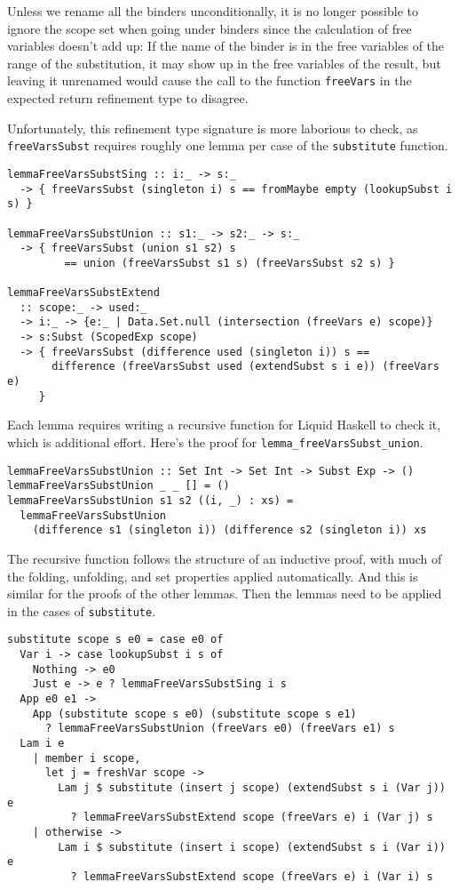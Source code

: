 \documentclass[acmtog, anonymous]{acmart}
\newcommand{\tc}[1]{{\small\texttt{#1}}}
\begin{document}
Unless we rename all the binders unconditionally, it is no longer
possible to ignore the scope set when going under binders since the calculation
of free variables doesn't add up:
If the name of the binder is in the free variables of the range of the substitution,
it may show up in the free variables of the result, but leaving it unrenamed would
cause the call to the function \tc{freeVars} in the expected return refinement type
to disagree.

Unfortunately, this refinement type signature is more laborious to check, as
\tc{free\-Vars\-Subst} requires roughly one lemma per case of the \tc{subs\-ti\-tute}
function.

\begin{verbatim}
lemmaFreeVarsSubstSing :: i:_ -> s:_
  -> { freeVarsSubst (singleton i) s == fromMaybe empty (lookupSubst i s) }

lemmaFreeVarsSubstUnion :: s1:_ -> s2:_ -> s:_
  -> { freeVarsSubst (union s1 s2) s
         == union (freeVarsSubst s1 s) (freeVarsSubst s2 s) }

lemmaFreeVarsSubstExtend
  :: scope:_ -> used:_
  -> i:_ -> {e:_ | Data.Set.null (intersection (freeVars e) scope)}
  -> s:Subst (ScopedExp scope)
  -> { freeVarsSubst (difference used (singleton i)) s ==
       difference (freeVarsSubst used (extendSubst s i e)) (freeVars e)
     }
\end{verbatim}

Each lemma requires writing a recursive function for Liquid Haskell to
check it, which is additional effort. Here's the proof for
\tc{lemma\_free\-Vars\-Subst\_union}.

\begin{verbatim}
lemmaFreeVarsSubstUnion :: Set Int -> Set Int -> Subst Exp -> ()
lemmaFreeVarsSubstUnion _ _ [] = ()
lemmaFreeVarsSubstUnion s1 s2 ((i, _) : xs) =
  lemmaFreeVarsSubstUnion
    (difference s1 (singleton i)) (difference s2 (singleton i)) xs
\end{verbatim}

The recursive function follows the structure of an inductive proof,
with much of the folding, unfolding, and set properties applied
automatically. And this is similar for the proofs of the other lemmas.
Then the lemmas need to be applied in the cases of \tc{substitute}.

\begin{verbatim}
substitute scope s e0 = case e0 of
  Var i -> case lookupSubst i s of
    Nothing -> e0
    Just e -> e ? lemmaFreeVarsSubstSing i s
  App e0 e1 ->
    App (substitute scope s e0) (substitute scope s e1)
      ? lemmaFreeVarsSubstUnion (freeVars e0) (freeVars e1) s
  Lam i e
    | member i scope,
      let j = freshVar scope ->
        Lam j $ substitute (insert j scope) (extendSubst s i (Var j)) e
          ? lemmaFreeVarsSubstExtend scope (freeVars e) i (Var j) s
    | otherwise ->
        Lam i $ substitute (insert i scope) (extendSubst s i (Var i)) e
          ? lemmaFreeVarsSubstExtend scope (freeVars e) i (Var i) s
\end{verbatim}
\end{document}
